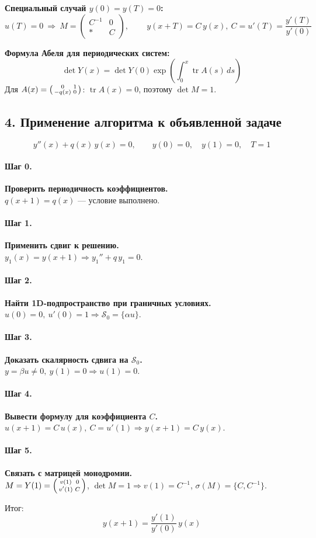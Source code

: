 \textbf{Специальный случай \(y(0)=y(T)=0\):}
\[
u(T)=0\ \Rightarrow\ 
M=\begin{pmatrix}C^{-1}&0\\ *&C\end{pmatrix},\qquad
\boxed{\,y(x+T)=C\,y(x),\ C=u'(T)=\dfrac{y'(T)}{y'(0)}\,}
\]

\textbf{Формула Абеля для периодических систем:}
\[
\boxed{\,\det Y(x)=\det Y(0)\exp\!\left(\int_0^x \operatorname{tr}A(s)\,ds\right)\,}
\]
Для \(A(x)=\begin{psmallmatrix}0&1\\ -q(x)&0\end{psmallmatrix}\): \(\operatorname{tr}A(x)=0\), поэтому \(\det M=1\).

\subsection*{4. Применение алгоритма к объявленной задаче}

\[
y''(x)+q(x)\,y(x)=0,\qquad y(0)=0,\quad y(1)=0,\quad T=1
\]

\paragraph{Шаг 0.} \textbf{Проверить периодичность коэффициентов.}\\
\(q(x+1)=q(x)\) — условие выполнено.

\paragraph{Шаг 1.} \textbf{Применить сдвиг к решению.}\\
\(y_1(x)=y(x+1)\Rightarrow y_1''+q\,y_1=0\).

\paragraph{Шаг 2.} \textbf{Найти 1D-подпространство при граничных условиях.}\\
\(u(0)=0,\ u'(0)=1\Rightarrow \mathcal S_0=\{\alpha u\}\).

\paragraph{Шаг 3.} \textbf{Доказать скалярность сдвига на \(\mathcal S_0\).}\\
\(y=\beta u\neq0,\ y(1)=0\Rightarrow u(1)=0\).

\paragraph{Шаг 4.} \textbf{Вывести формулу для коэффициента \(C\).}\\
\(u(x+1)=C\,u(x),\ C=u'(1)\Rightarrow y(x+1)=C\,y(x)\).

\paragraph{Шаг 5.} \textbf{Связать с матрицей монодромии.}\\
\(M=Y(1)=\begin{psmallmatrix}v(1)&0\\ v'(1)&C\end{psmallmatrix}\), \(\det M=1\Rightarrow v(1)=C^{-1}\), \(\sigma(M)=\{C,C^{-1}\}\).

Итог:
\[
\boxed{\,y(x+1)=\dfrac{y'(1)}{y'(0)}\,y(x)\,}
\]

